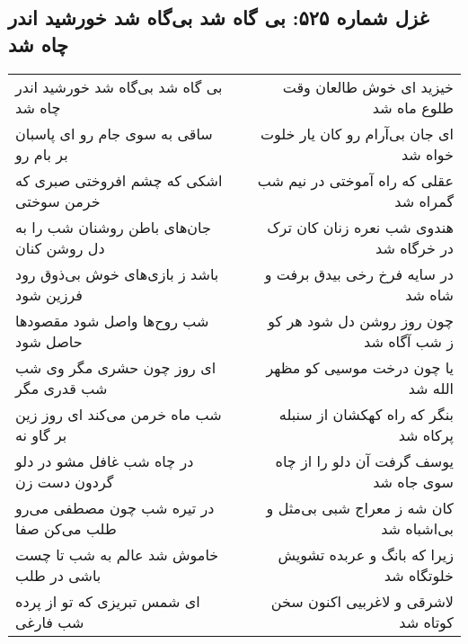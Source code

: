 \begin{center}
\section*{غزل شماره ۵۲۵: بی گاه شد بی‌گاه شد خورشید اندر چاه شد}
\label{sec:0525}
\begin{longtable}{l p{0.5cm} r}
بی گاه شد بی‌گاه شد خورشید اندر چاه شد
&&
خیزید ای خوش طالعان وقت طلوع ماه شد
\\
ساقی به سوی جام رو ای پاسبان بر بام رو
&&
ای جان بی‌آرام رو کان یار خلوت خواه شد
\\
اشکی که چشم افروختی صبری که خرمن سوختی
&&
عقلی که راه آموختی در نیم شب گمراه شد
\\
جان‌های باطن روشنان شب را به دل روشن کنان
&&
هندوی شب نعره زنان کان ترک در خرگاه شد
\\
باشد ز بازی‌های خوش بی‌ذوق رود فرزین شود
&&
در سایه فرخ رخی بیدق برفت و شاه شد
\\
شب روح‌ها واصل شود مقصودها حاصل شود
&&
چون روز روشن دل شود هر کو ز شب آگاه شد
\\
ای روز چون حشری مگر وی شب شب قدری مگر
&&
یا چون درخت موسیی کو مظهر الله شد
\\
شب ماه خرمن می‌کند ای روز زین بر گاو نه
&&
بنگر که راه کهکشان از سنبله پرکاه شد
\\
در چاه شب غافل مشو در دلو گردون دست زن
&&
یوسف گرفت آن دلو را از چاه سوی جاه شد
\\
در تیره شب چون مصطفی می‌رو طلب می‌کن صفا
&&
کان شه ز معراج شبی بی‌مثل و بی‌اشباه شد
\\
خاموش شد عالم به شب تا چست باشی در طلب
&&
زیرا که بانگ و عربده تشویش خلوتگاه شد
\\
ای شمس تبریزی که تو از پرده شب فارغی
&&
لاشرقی و لاغربیی اکنون سخن کوتاه شد
\\
\end{longtable}
\end{center}
